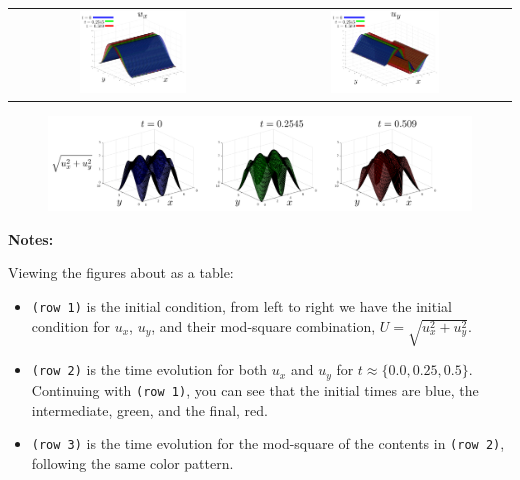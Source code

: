 \documentclass[12pt,twoside]{article}
\begin{document}
\begin{tabular}{ c c }
\centering
  \includegraphics[width=0.45\textwidth]{UxTimeEvol.png} & \includegraphics[width=0.45\textwidth]{UyTimeEvol.png} \\
\end{tabular}

\begin{figure}[h]
\includegraphics[width=\textwidth]{SuperPosVelEvolution.png}
\end{figure}

\textbf{Notes:}

Viewing the figures about as a table: 
\begin{itemize}
	\item \texttt{(row 1)} is the initial condition, from left to right we have the initial condition for $u_{x}$, $u_{y}$, and their mod-square combination, $U = \sqrt{u_{x}^{2} + u_{y}^{2}}$.
	\item \texttt{(row 2)} is the time evolution for both $u_{x}$ and $u_{y}$ for $t\approx\{0.0, 0.25, 0.5\}$. Continuing with \texttt{(row 1)}, you can see that the initial times are blue, the intermediate, green, and the final, red.
	\item \texttt{(row 3)} is the time evolution for the mod-square of the contents in \texttt{(row 2)}, following the same color pattern.
\end{itemize}
\end{document}
